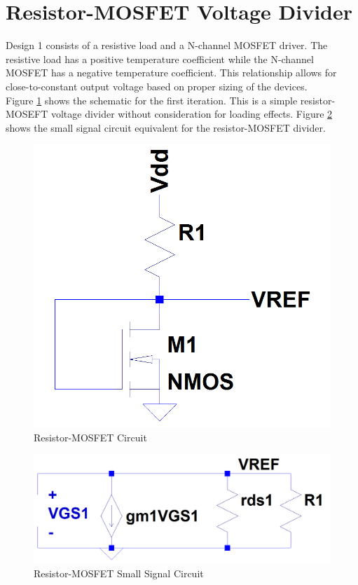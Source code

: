 \documentclass[conference]{IEEEtran}
\newcommand{\tab}{\hspace*{2em}}
\begin{document}
\section{Resistor-MOSFET Voltage Divider}
Design 1 consists of a resistive load and a N-channel MOSFET driver.  The resistive load has a positive temperature coefficient while the N-channel MOSFET has a negative temperature coefficient.  This relationship allows for close-to-constant output voltage based on proper sizing of the devices.\\\tab
Figure \ref{fig:resistor-mosfet1} shows the schematic for the first iteration.  This is a simple resistor-MOSEFT voltage divider without consideration for loading effects.  Figure \ref{fig:resistor-mosfet1-ss} shows the small signal circuit equivalent for the resistor-MOSFET divider.
\begin{figure}[!htbp]
  \centering
  \includegraphics[scale=0.25]{images/resistor-mosfet1.png}
  \caption[resistor1]{Resistor-MOSFET Circuit}
  \label{fig:resistor-mosfet1}
\end{figure}
\begin{figure}[!htbp]
  \centering
  \includegraphics[scale=0.25]{images/resistor-mosfet1-ss.png}
  \caption[resistor1-ss]{Resistor-MOSFET Small Signal Circuit}
  \label{fig:resistor-mosfet1-ss}
\end{figure}
\end{document}

